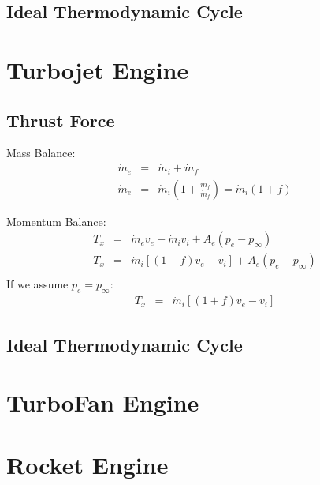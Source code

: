     \subsection{Ideal Thermodynamic Cycle}
    
    
    

\newpage
\section{Turbojet Engine}
    \subsection{Thrust Force}
    Mass Balance:
    \begin{align}
        \dot{m}_e &= &\dot{m}_i + \dot{m}_f\\
        \dot{m}_e &= &\dot{m}_i ( 1 + \frac{\dot{m}_f}{\dot{m}_f}) = \dot{m}_i ( 1 + f) 
    \end{align}

    Momentum Balance:
    \begin{align}
        T_x &=& \dot{m}_e v_e - \dot{m}_i v_i + A_e (p_e - p_\infty)\\
        T_x &=& \dot{m}_i[(1+f)v_e - v_i] + A_e (p_e - p_\infty)\\
    \end{align}
    If we assume $p_e = p_\infty$:
    \begin{align}
        T_x &=& \dot{m}_i[(1+f)v_e - v_i] 
    \end{align}
    

    \subsection{Ideal Thermodynamic Cycle}



\newpage
\section{TurboFan Engine}

\newpage
\section{Rocket Engine}
